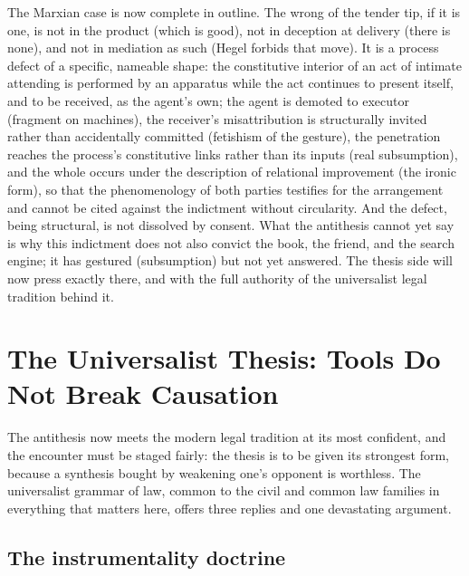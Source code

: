 The Marxian case is now complete in outline. The wrong of the tender tip, if it is one, is not in the product (which is good), not in deception at delivery (there is none), and not in mediation as such (Hegel forbids that move). It is a process defect of a specific, nameable shape: the constitutive interior of an act of intimate attending is performed by an apparatus while the act continues to present itself, and to be received, as the agent's own; the agent is demoted to executor (fragment on machines), the receiver's misattribution is structurally invited rather than accidentally committed (fetishism of the gesture), the penetration reaches the process's constitutive links rather than its inputs (real subsumption), and the whole occurs under the description of relational improvement (the ironic form), so that the phenomenology of both parties testifies for the arrangement and cannot be cited against the indictment without circularity. And the defect, being structural, is not dissolved by consent. What the antithesis cannot yet say is why this indictment does not also convict the book, the friend, and the search engine; it has gestured (subsumption) but not yet answered. The thesis side will now press exactly there, and with the full authority of the universalist legal tradition behind it.
\section{The Universalist Thesis: Tools Do Not Break Causation}
\label{p02:sec:thesis}

The antithesis now meets the modern legal tradition at its most confident, and the encounter must be staged fairly: the thesis is to be given its strongest form, because a synthesis bought by weakening one's opponent is worthless. The universalist grammar of law, common to the civil and common law families in everything that matters here, offers three replies and one devastating argument.

\subsection{The instrumentality doctrine}
\label{p02:sec:thesis-instrument}

